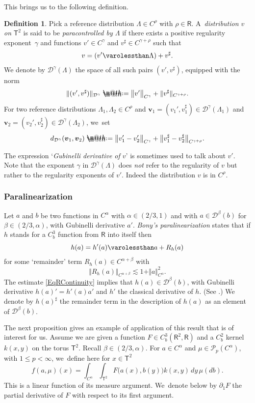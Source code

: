 \documentclass[JEP,XML,SOM,Unicode,published]{cedram}
\makeatletter
\theoremstyle{definition}
\newtheorem{defn}[thm]{Definition}
\newcommand\bbR{\mathbf{\mathsf{R}}}
\newcommand{\bsfT}{\mathbf{\mathsf{T}}}
\newcommand{\mcD}{\mathcal{D}}
\newcommand{\mcP}{\mathcal{P}}
\newcommand{\bsv}{\boldsymbol{v}}
\newcommand*{\defeq}{\mathrel{\rlap{%
\raisebox{0.3ex}{$\m@th\cdot$}}%
\raisebox{-0.3ex}{$\m@th\cdot$}}%
=}
\newcommand{\norme}[1]{\Vert #1 \Vert}
\makeatother
\begin{document}
This brings us to the following definition.

\begin{defn} \label{DefnSpacePCStructure}
Pick a reference distribution $\Lambda\in C^\rho$ with $\rho\in\bbR$. A~\emph{distribution $v$ on} \emph{$\bsfT^2$} is said to be \emph{paracontrolled by $\Lambda$} if there exists a positive regularity exponent~$\gamma$ and functions $v'\in C^\gamma$ and $v^\sharp\in C^{\gamma+\rho}$ such that
\[
v = (v'\varolessthan\Lambda) + v^\sharp.
\]
We denote by $\mcD^\gamma(\Lambda)$ the space of all such pairs $(v',v^\sharp)$, equipped with the norm
\begin{equation*}
\norme{(v', v^\sharp)}_{\mcD^\gamma} \defeq \big\Vert v'\big\Vert_{C^\gamma} + \norme{v^\sharp}_{C^{\gamma+\rho}}.
\end{equation*}
For two reference distributions $\Lambda_1,\Lambda_2\in C^\rho$ and $\bsv_1=(v_1', v_1^\sharp)\in\mcD^\gamma(\Lambda_1)$ and $\bsv_2 = (v_2',v_2^\sharp)\in\mcD^\gamma(\Lambda_2)$, we~set
\[
d_{\mcD^\gamma}(\bsv_1,\bsv_2) \defeq \big\Vert v_1' - v_2'\big\Vert_{C^\gamma} + \big\Vert v_1^\sharp - v_2^\sharp \big\Vert_{C^{\gamma+\rho}}.
\]
\end{defn}

The expression `\emph{Gubinelli derivative of $v$}' is sometimes used to talk about $v'$. Note that the exponent $\gamma$ in $\mcD^\gamma(\Lambda)$ does \emph{not} refer to the regularity of $v$ but rather to the regularity exponents of $v'$. Indeed the distribution $v$ is in $C^\rho$.

\subsubsection*{Paralinearization} Let $a$ and $b$ be two functions in $C^\alpha$ with $\alpha\in(2/3,1)$ and with $a\in\mcD^\beta(b)$ for $\beta\in(2/3,\alpha)$, with Gubinelli derivative $a'$. {\it Bony's paralinearization} states that if $h$ stands for a $C^3_b$ function from $\bbR$ into itself then
\[
h(a) = h'(a)\varolessthan a + R_h(a)
\]
for some `remainder' term $R_h(a)\in C^{\alpha+\beta}$ with
\[
\norme{R_h(a)}_{C^{\alpha+\beta}}\lesssim 1+\norme{a}_{C^\alpha}^2.
\]
The estimate \ref{EqRContinuity} implies that $h(a)\in\mcD^\beta(b)$, with Gubinelli derivative $h(a)' = h'(a)a'$ and $h'$ the classical derivative of $h$. (See \eg \cite[\S2.3]{GIP}.) We denote by $h(a)^\sharp$ the remainder term in the description of $h(a)$ as an element of $\mcD^\beta(b)$.

The next proposition gives an example of application of this result that is of interest for us. Assume we are given a function $F\in C_b^3(\bbR^2,\bbR)$ and a $C^2_b$ kernel $k(x,y)$ on the torus $\mathsf{T}^2$. Recall $\beta\in(2/3,\alpha)$. For $a\in C^\alpha$ and $\mu\in\mcP_{p}(C^\alpha)$, with $1\leq p<\infty$, we~define here for $x\in \mathsf{T}^2$
\begin{equation} \label{EqLongRangeF}
f(a,\mu)(x) = \int_{C^\alpha}\int_{\mathsf{T}^2} F\bigl(a(x), b(y)\bigr)k(x,y) \, dy \, \mu(db).
\end{equation}
This is a linear function of its measure argument. We~denote below by $\partial_1F$ the partial derivative of $F$ with respect to its first argument.
\end{document}
